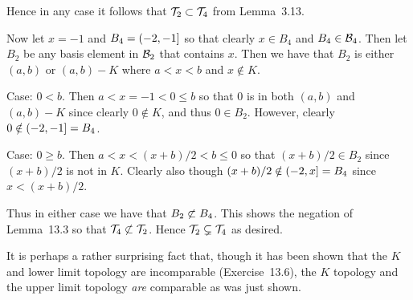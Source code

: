{{    Hence in any case it follows that $\mathcal{T}_2 \subset \mathcal{T}_4$ from Lemma~3.13.

    Now let $x = -1$ and $B_4 = (-2, -1]$ so that clearly $x \in B_4$ and $B_4 \in \mathcal{B}_4$.
    Then let $B_2$ be any basis element in $\mathcal{B}_2$ that contains $x$.
    Then we have that $B_2$ is either $(a,b)$ or $(a,b) - K$ where $a < x < b$ and $x \notin K$.

    Case: $0 < b$.
    Then $a < x = -1 < 0 \leq b$ so that $0$ is in both $(a,b)$ and $(a,b) - K$ since clearly $0 \notin K$, and thus $0 \in B_2$.
    However, clearly $0 \notin (-2,-1] = B_4$.

    Case: $0 \geq b$.
    Then $a < x < (x+b)/2 < b \leq 0$ so that $(x+b)/2 \in B_2$ since $(x+b)/2$ is not in $K$.
    Clearly also though $(x+b)/2 \notin (-2, x] = B_4$ since $x < (x+b)/2$.

    Thus in either case we have that $B_2 \not \subset B_4$.
    This shows the negation of Lemma~13.3 so that $\mathcal{T}_4 \not \subset \mathcal{T}_2$.
    Hence $\mathcal{T}_2 \subsetneq \mathcal{T}_4$ as desired.
  }

  It is perhaps a rather surprising fact that, though it has been shown that the $K$ and lower limit topology are incomparable (Exercise~13.6), the $K$ topology and the upper limit topology \emph{are} comparable as was just shown.
}

